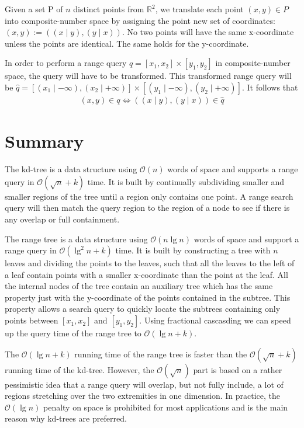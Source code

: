 \noindent Given a set P of $n$ distinct points from $\mathbb{R}^2$, we translate each point $(x,y) \in P$ into composite-number space by assigning the point new set of coordinates: $(x,y) := ( (x \mid y), (y \mid x) )$. No two points will have the same x-coordinate unless the points are identical. The same holds for the y-coordinate.

\noindent In order to perform a range query $q = [x_1, x_2] \times [y_1, y_2]$ in composite-number space, the query will have to be transformed. This transformed range query will be $\hat{q} = [(x_1 \mid -\infty), (x_2 \mid +\infty)] \times [(y_1 \mid -\infty), (y_2 \mid +\infty)]$. It follows that 
\begin{align*}
  (x,y) \in q \iff ( (x \mid y), (y \mid x) ) \in \hat{q}
\end{align*}


\section{Summary}
\label{sect:relsummary}

The kd-tree is a data structure using $\mathcal{O}(n)$ words of space and supports a range query in $\mathcal{O}(\sqrt{n} + k)$ time. It is built by continually subdividing smaller and smaller regions of the tree until a region only contains one point. A range search query will then match the query region to the region of a node to see if there is any overlap or full containment. 

The range tree is a data structure using $\mathcal{O}(n \lg n)$ words of space and support a range query in $\mathcal{O}(\lg^2 n + k)$ time. It is built by constructing a tree with $n$ leaves and dividing the points to the leaves, such that all the leaves to the left of a leaf contain points with a smaller x-coordinate than the point at the leaf. All the internal nodes of the tree contain an auxiliary tree which has the same property just with the y-coordinate of the points contained in the subtree. This property allows a search query to quickly locate the subtrees containing only points between $[x_1, x_2]$ and $[y_1, y_2]$. Using fractional cascasding we can speed up the query time of the range tree to $\mathcal{O}(\lg n + k)$.

The $\mathcal{O}(\lg n + k)$ running time of the range tree is faster than the $\mathcal{O}(\sqrt{n} + k)$ running time of the kd-tree. However, the $\mathcal{O}(\sqrt{n})$ part is based on a rather pessimistic idea that a range query will overlap, but not fully include, a lot of regions stretching over the two extremities in one dimension. In practice, the $\mathcal{O}(\lg n)$ penalty on space is prohibited for most applications and is the main reason why kd-trees are preferred.
